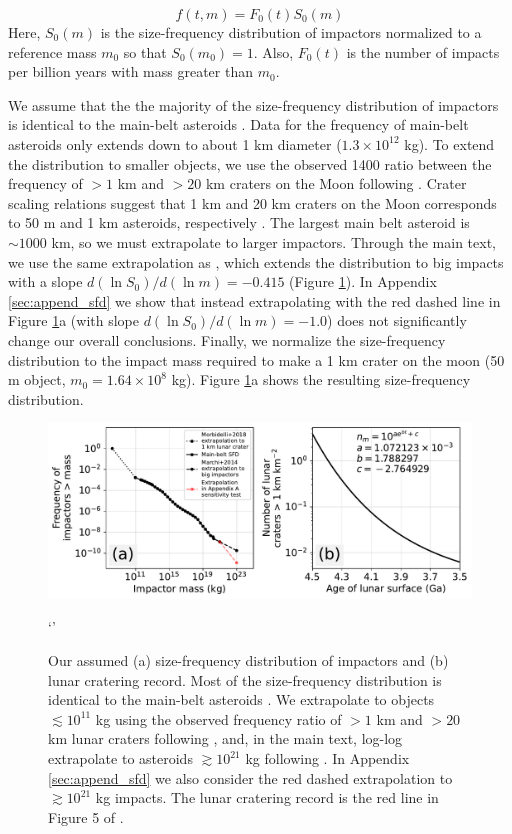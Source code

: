 \documentclass[manuscript]{aastex63}
\begin{document}
\begin{equation}
  f(t,m) = F_0(t) S_0(m)
\end{equation}
Here, $S_0(m)$ is the size-frequency distribution of impactors normalized to a reference mass $m_0$ so that $S_0(m_0) = 1$. Also, $F_0(t)$ is the number of impacts per billion years with mass greater than $m_0$.

We assume that the the majority of the size-frequency distribution of impactors is identical to the main-belt asteroids \citep[Extended Data Figure 1 in][]{Marchi_2014}. Data for the frequency of main-belt asteroids only extends down to about 1 km diameter ($1.3 \times 10^{12} $ kg). To extend the distribution to smaller objects, we use the observed 1400 ratio between the frequency of $> 1$ km and $> 20$ km craters on the Moon following \citet{Morbidelli_2018}. Crater scaling relations suggest that 1 km and 20 km craters on the Moon corresponds to 50 m and 1 km asteroids, respectively \citep{Morbidelli_2018}. The largest main belt asteroid is $\sim 1000$ km, so we must extrapolate to larger impactors. Through the main text, we use the same extrapolation as \citet{Marchi_2014}, which extends the distribution to big impacts with a slope $d (\ln S_0)/d (\ln m) = - 0.415$ (Figure \ref{fig:sfd_and_flux}). In Appendix \ref{sec:append_sfd} we show that instead extrapolating with the red dashed line in Figure \ref{fig:sfd_and_flux}a (with slope $d (\ln S_0)/d (\ln m) = - 1.0$) does not significantly change our overall conclusions. Finally, we normalize the size-frequency distribution to the impact mass required to make a 1 km crater on the moon (50 m object, $m_0 = 1.64 \times 10^{8}$ kg). Figure \ref{fig:sfd_and_flux}a shows the resulting size-frequency distribution.

\begin{figure}
  \centering
  \includegraphics[width=1.0\textwidth]{figures/SFD_and_flux.pdf}
  \caption{Our assumed (a) size-frequency distribution of impactors and (b) lunar cratering record. Most of the size-frequency distribution is identical to the main-belt asteroids \citep[Extended Data Figure 1 in][]{Marchi_2014}. We extrapolate to objects $\lesssim 10^{11}$ kg using the observed frequency ratio of $> 1$ km and $> 20$ km lunar craters following \citet{Morbidelli_2018}, and, in the main text, log-log extrapolate to asteroids $\gtrsim 10^{21}$ kg following \citet{Marchi_2014}. In Appendix \ref{sec:append_sfd} we also consider the red dashed extrapolation to $\gtrsim 10^{21}$ kg impacts. The lunar cratering record is the red line in Figure 5 of \citet{Morbidelli_2018}.}`'
  \label{fig:sfd_and_flux}
\end{figure}
\end{document}
